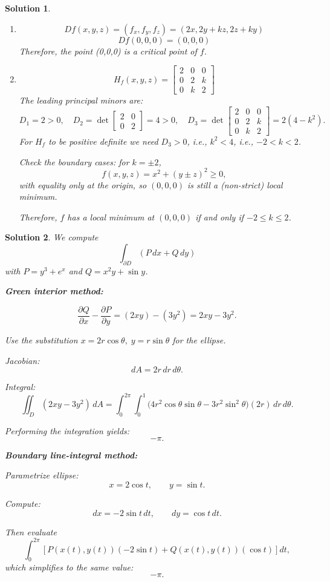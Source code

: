 \documentclass{article}
\newtheorem{solution}{Solution}
\begin{document}
\begin{solution}
\begin{enumerate}[label=(\alph*)]
    \item \[Df(x,y,z) = (f_x,f_y,f_z) = (2x, 2y + kz, 2z + ky)\] \[Df(0,0,0) = (0, 0, 0)\] Therefore, the point (0,0,0) is a critical point of \(f\).
    \item \[H_f(x,y,z) = \begin{bmatrix} 2 & 0 & 0 \\ 0 & 2 & k \\ 0 & k & 2 \end{bmatrix}\]
    The leading principal minors are:
    \[D_1 = 2 > 0, \quad D_2 = \det\begin{bmatrix} 2 & 0 \\ 0 & 2 \end{bmatrix} = 4 > 0, \quad D_3 = \det\begin{bmatrix} 2 & 0 & 0 \\ 0 & 2 & k \\ 0 & k & 2 \end{bmatrix} = 2(4 - k^2).\]
    For \(H_f\) to be positive definite we need \(D_3 > 0\), i.e., \(k^2 < 4\), i.e., \(-2 < k < 2\).

    Check the boundary cases: for \(k = \pm 2\),
    \[f(x,y,z) = x^2 + (y \pm z)^2 \geq 0,\]
    with equality only at the origin, so $(0,0,0)$ is still a (non-strict) local minimum.

    Therefore, \(f\) has a local minimum at $(0,0,0)$ if and only if \(-2 \leq k \leq 2\).
\end{enumerate}
\end{solution}

\begin{solution}
We compute
\[
\int_{\partial D} (P\,dx + Q\,dy)
\]
with $P = y^3 + e^x$ and $Q = x^2 y + \sin y$.

\textbf{Green interior method:}

\[
\frac{\partial Q}{\partial x} - \frac{\partial P}{\partial y}
= (2xy) - (3y^2)
= 2xy - 3y^2.
\]

Use the substitution $x=2r\cos\theta,\; y = r\sin\theta$ for the ellipse.

Jacobian:
\[
dA = 2r\, dr\, d\theta.
\]

Integral:
\[
\iint_D (2xy - 3y^2)\, dA
= \int_0^{2\pi}\!\int_0^1
\big(4r^2\cos\theta\sin\theta - 3r^2\sin^2\theta \big)(2r)\, dr\, d\theta.
\]

Performing the integration yields:
\[
\boxed{ -\pi }.
\]

\textbf{Boundary line-integral method:}

Parametrize ellipse:
\[
x = 2\cos t,\qquad y = \sin t.
\]

Compute:
\[
dx = -2\sin t\, dt,\qquad dy = \cos t\, dt.
\]

Then evaluate
\[
\int_0^{2\pi} 
\left[
P(x(t),y(t))(-2\sin t)
+
Q(x(t),y(t))(\cos t)
\right] dt,
\]
which simplifies to the same value:
\[
\boxed{-\pi}.
\]
\end{solution}
\end{document}
